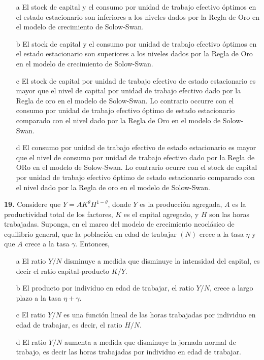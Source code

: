 \documentclass{nuevotema}
\begin{document}
\begin{itemize}
	\item[a] El stock de capital y el consumo por unidad de trabajo efectivo óptimos en el estado estacionario son inferiores a los niveles dados por la Regla de Oro en el modelo de crecimiento de Solow-Swan.
	\item[b] El stock de capital y el consumo por unidad de trabajo efectivo óptimos en el estado estacionario son superiores a los niveles dados por la Regla de Oro en el modelo de crecimiento de Solow-Swan.
	\item[c] El stock de capital por unidad de trabajo efectivo de estado estacionario es mayor que el nivel de capital por unidad de trabajo efectivo dado por la Regla de oro en el modelo de Solow-Swan. Lo contrario occurre con el consumo por unidad de trabajo efectivo óptimo de estado estacionario comparado con el nivel dado por la Regla de Oro en el modelo de Solow-Swan.
	\item[d] El consumo por unidad de trabajo efectivo de estado estacionario es mayor que el nivel de consumo por unidad de trabajo efectivo dado por la Regla de ORo en el modelo de Solow-Swan. Lo contrario ocurre con el stock de capital por unidad de trabajo efectivo óptimo de estado estacionario comparado con el nivel dado por la Regla de oro en el modelo de Solow-Swan.
\end{itemize}


\textbf{19.} Considere que $Y=A K^\theta H^{1-\theta}$, donde $Y$ es la producción agregada, $A$ es la productividad total de los factores, $K$ es el capital agregado, y $H$ son las horas trabajadas. Suponga, en el marco del modelo de crecimiento neoclásico de equilibrio general, que la población en edad de trabajar $(N)$ crece a la tasa $\eta$ y que $A$ crece a la tasa $\gamma$. Entonces,

\begin{itemize}
	\item[a] El ratio $Y/N$ disminuye a medida que disminuye la intensidad del capital, es decir el ratio capital-producto $K/Y$.
	\item[b] El producto por individuo en edad de trabajar, el ratio $Y/N$, crece a largo plazo a la tasa $\eta + \gamma$.
	\item[c] El ratio $Y/N$ es una función lineal de las horas trabajadas por individuo en edad de trabajar, es decir, el ratio $H/N$.
	\item[d] El ratio $Y/N$ aumenta a medida que disminuye la jornada normal de trabajo, es decir las horas trabajadas por individuo en edad de trabajar.
\end{itemize}
\end{document}
